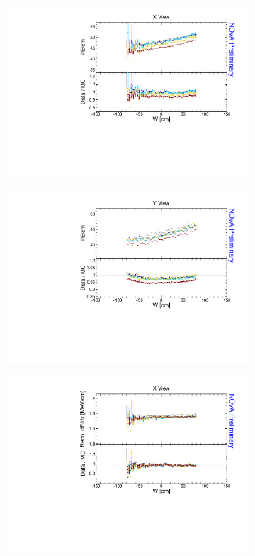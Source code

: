 \begin{figure}[!ht]
  \begin{subfigure}{0.495\textwidth}
    \includegraphics[width=\linewidth]{Plots/Calibana/pecm_w_x.pdf}
  \end{subfigure}
  \begin{subfigure}{0.495\textwidth}
    \includegraphics[width=\linewidth]{Plots/Calibana/pecm_w_y.pdf}
  \end{subfigure}
  \begin{subfigure}{0.495\textwidth}
    \includegraphics[width=\linewidth]{Plots/Calibana/recomevcm_w_x.pdf}

\end{subfigure}
\end{figure}
